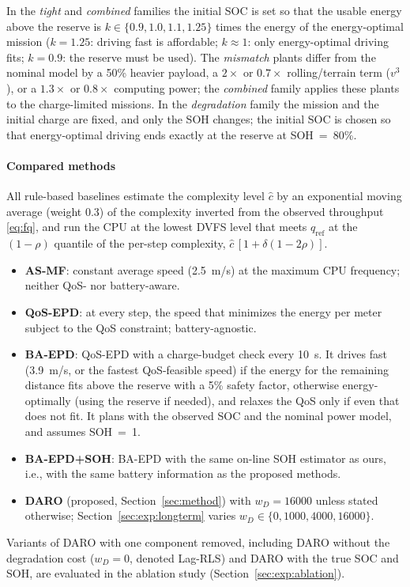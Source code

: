 In the \emph{tight} and \emph{combined} families the initial \ac{SOC} is set so that the usable energy above the
reserve is $k \in \{0.9, 1.0, 1.1, 1.25\}$ times the energy of the energy-optimal mission
($k = 1.25$: driving fast is affordable; $k \approx 1$: only energy-optimal driving fits;
$k = 0.9$: the reserve must be used). The \emph{mismatch} plants differ from the nominal model
by a 50\% heavier payload, a $2\times$ or $0.7\times$ rolling/terrain term ($v^3$), or a
$1.3\times$ or $0.8\times$ computing power; the \emph{combined} family applies these plants to the
charge-limited missions. In the \emph{degradation} family the mission and the
initial charge are fixed, and only the \ac{SOH} changes; the initial \ac{SOC} is chosen so that
energy-optimal driving ends exactly at the reserve at \ac{SOH}~=~80\%.

\paragraph{Compared methods}
All rule-based baselines estimate the complexity level $\hat c$ by an exponential moving average
(weight 0.3) of the complexity inverted from the observed throughput \eqref{eq:fq}, and run the
\ac{CPU} at the lowest \ac{DVFS} level that meets $q_{\mathrm{ref}}$ at the $(1-\rho)$ quantile of the
per-step complexity, $\hat c\,[1 + \delta(1 - 2\rho)]$.
\begin{itemize}
  \item \textbf{AS-MF}: constant average speed (2.5~m/s) at the maximum \ac{CPU} frequency;
        neither \ac{QoS}- nor battery-aware.
  \item \textbf{QoS-EPD}: at every step, the speed that minimizes the energy per meter
        subject to the \ac{QoS} constraint; battery-agnostic.
  \item \textbf{BA-EPD}: QoS-EPD with a charge-budget check every 10~s. It drives fast
        (3.9~m/s, or the fastest \ac{QoS}-feasible speed) if the energy for the remaining distance
        fits above the reserve with a 5\% safety factor, otherwise energy-optimally (using the
        reserve if needed), and relaxes the \ac{QoS} only if even that does not fit. It plans with
        the observed \ac{SOC} and the nominal power model, and assumes \ac{SOH}~=~1.
  \item \textbf{BA-EPD+SOH}: BA-EPD with the same on-line \ac{SOH} estimator as ours, i.e., with the
        same battery information as the proposed methods.
  \item \textbf{DARO} (proposed, Section~\ref{sec:method}) with $w_D = 16000$ unless stated
        otherwise; Section~\ref{sec:exp:longterm} varies $w_D \in \{0, 1000, 4000, 16000\}$.
\end{itemize}
Variants of DARO with one component removed, including DARO without the degradation cost
($w_D = 0$, denoted Lag-RLS) and DARO with the true \ac{SOC} and \ac{SOH}, are evaluated in the
ablation study (Section~\ref{sec:exp:ablation}).

